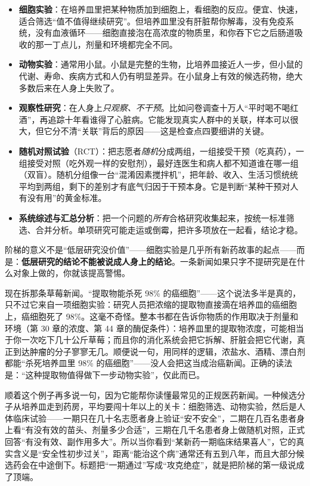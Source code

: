 \begin{itemize}[itemsep=2pt]
\item \textbf{细胞实验}：在培养皿里把某种物质加到细胞上，看细胞的反应。便宜、快速，适合筛选“值不值得继续研究”。但培养皿里没有肝脏帮你解毒，没有免疫系统，没有血液循环——细胞直接泡在高浓度的物质里，和你吞下它之后肠道吸收的那一丁点儿，剂量和环境都完全不同。
\item \textbf{动物实验}：通常用小鼠。小鼠是完整的生物，比培养皿接近人一步，但小鼠的代谢、寿命、疾病方式和人仍有明显差异。在小鼠身上有效的候选药物，绝大多数后来在人身上失败了。
\item \textbf{观察性研究}：在人身上\emph{只观察、不干预}。比如问卷调查十万人“平时喝不喝红酒”，再追踪十年看谁得了心脏病。它能发现真实人群中的关联，样本可以很大，但它分不清“关联”背后的原因——这是检查点四要细讲的关键。
\item \textbf{随机对照试验}（RCT）：把志愿者\emph{随机}分成两组，一组接受干预（吃真药），一组接受对照（吃外观一样的安慰剂），最好连医生和病人都不知道谁在哪一组（双盲）。随机分组像一台“混淆因素搅拌机”，把年龄、收入、生活习惯统统平均到两组，剩下的差别才有底气归因于干预本身。它是判断“某种干预对人有没有用”的黄金标准。
\item \textbf{系统综述与汇总分析}：把一个问题的\emph{所有}合格研究收集起来，按统一标准筛选、合并分析。单项研究可能走运或倒霉，把许多项放在一起看，结论才稳。
\end{itemize}

阶梯的意义不是“低层研究没价值”——细胞实验是几乎所有新药故事的起点——而是：\textbf{低层研究的结论不能被说成人身上的结论}。一条新闻如果只字不提研究是在什么对象上做的，你就该提高警惕。

现在拆那条草莓新闻。“提取物能杀死 98\% 的癌细胞”——这个说法多半是真的，只不过它来自一项细胞实验：研究人员把浓缩的提取物直接滴在培养皿的癌细胞上，癌细胞死了 98\%。这毫不奇怪。整本书都在告诉你物质的作用取决于剂量和环境（第 30 章的浓度、第 44 章的酶促条件）：培养皿里的提取物浓度，可能相当于你一次吃下几十公斤草莓；而且你的消化系统会把它拆解、肝脏会把它代谢，真正到达肿瘤的分子寥寥无几。顺便说一句，用同样的逻辑，浓盐水、酒精、漂白剂都能“杀死培养皿里 98\% 的癌细胞”——没人会把这当成治癌新闻。正确的读法是：“这种提取物值得做下一步动物实验”，仅此而已。

顺着这个例子再多说一句，因为它能帮你读懂最常见的正规医药新闻。一种候选分子从培养皿走到药房，平均要闯十年以上的关卡：细胞筛选、动物实验，然后是人体临床试验——一期只在几十名志愿者身上验证“安不安全”，二期在几百名患者身上看“有没有效的苗头、剂量多少合适”，三期在几千名患者身上做随机对照，正式回答“有没有效、副作用多大”。所以当你看到“某新药一期临床结果喜人”，它的真实含义是“安全性初步过关”，距离“能治这个病”通常还有五到八年，而且大部分候选药会在中途倒下。标题把“一期通过”写成“攻克绝症”，就是把阶梯的第一级说成了顶端。

